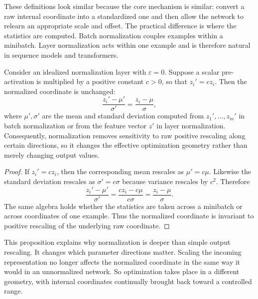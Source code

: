 \medskip

These definitions look similar because the core mechanism is similar: convert a raw internal coordinate into a standardized one and then allow the network to relearn an appropriate scale and offset.
The practical difference is where the statistics are computed.
Batch normalization couples examples within a minibatch.
Layer normalization acts within one example and is therefore natural in sequence models and transformers.

\begin{proposition}
Consider an idealized normalization layer with $\varepsilon=0$.
Suppose a scalar pre-activation is multiplied by a positive constant $c>0$, so that $z_i'=c z_i$.
Then the normalized coordinate is unchanged:
\[
\frac{z_i'-\mu'}{\sigma'}
=
\frac{z_i-\mu}{\sigma},
\]
where $\mu',\sigma'$ are the mean and standard deviation computed from $z_1',\dots,z_m'$ in batch normalization or from the feature vector $z'$ in layer normalization.
Consequently, normalization removes sensitivity to raw positive rescaling along certain directions, so it changes the effective optimization geometry rather than merely changing output values.
\end{proposition}

\begin{proof}
If $z_i'=c z_i$, then the corresponding mean rescales as $\mu'=c\mu$.
Likewise the standard deviation rescales as $\sigma'=c\sigma$ because variance rescales by $c^2$.
Therefore
\[
\frac{z_i'-\mu'}{\sigma'}
=
\frac{c z_i-c\mu}{c\sigma}
=
\frac{z_i-\mu}{\sigma}.
\]
The same algebra holds whether the statistics are taken across a minibatch or across coordinates of one example.
Thus the normalized coordinate is invariant to positive rescaling of the underlying raw coordinate.
\end{proof}

This proposition explains why normalization is deeper than simple output rescaling.
It changes which parameter directions matter.
Scaling the incoming representation no longer affects the normalized coordinate in the same way it would in an unnormalized network.
So optimization takes place in a different geometry, with internal coordinates continually brought back toward a controlled range.

